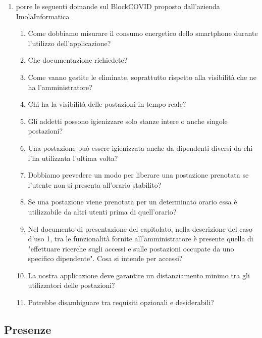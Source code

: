 \begin{enumerate}
	\item porre le seguenti domande sul  BlockCOVID proposto dall'azienda \mbox{ImolaInformatica}
	\begin{enumerate}
		\item Come dobbiamo misurare il consumo energetico dello smartphone durante l'utilizzo dell'applicazione?
		
		\item Che documentazione richiedete?
		
		\item Come vanno gestite le  eliminate, soprattutto rispetto alla visibilità che ne ha l'amministratore?
		
		\item Chi ha la visibilità delle postazioni in tempo reale?
		
		\item Gli addetti possono igienizzare solo stanze intere o anche singole postazioni?
		
		\item Una postazione può essere igienizzata anche da dipendenti diversi da chi l'ha utilizzata l'ultima volta?
		
		\item Dobbiamo prevedere un modo per liberare una postazione prenotata se l'utente non si presenta all'orario stabilito?
		
		\item Se una postazione viene prenotata per un determinato orario essa è utilizzabile da altri utenti prima di quell'orario?
		
		\item Nel documento di presentazione del capitolato, nella descrizione del caso d'uso 1, tra le funzionalità fornite all'amministratore è presente quella di "effettuare ricerche sugli accessi e sulle postazioni occupate da uno specifico dipendente". Cosa si intende per accessi?
		
		\item La nostra applicazione deve garantire un distanziamento minimo tra gli utilizzatori delle postazioni?
		
		\item Potrebbe disambiguare tra requisiti opzionali e desiderabili?
		
	\end{enumerate}
\end{enumerate}

\subsection*{Presenze}

